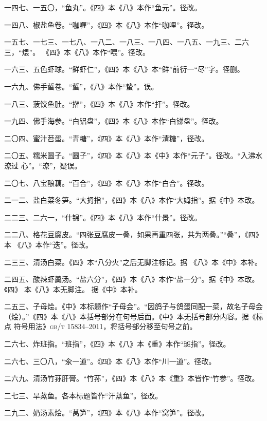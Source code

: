 \begin{list}{}
一四七、一五〇，“鱼丸”。《四》本《八》本作“鱼元”。径改。

一四八、椒盐鱼卷。“咖喱”，《四》本《八》本作“咖哩”。径改。

一五七、一七三、一七八、一八二、一八三、一八四、一八五、一九三、二六三，“煨”。
《四》本《八》本作“喂”。径改。

一六三、五色虾球。“鲜虾仁”，《四》本《八》本“鲜”前衍一“尽”字。径删。

一六九、佛手蜇卷。“蜇”，《八》本作“蛰”。误。

一八三、菠饺鱼肚。“擀”，《四》本《八》本作“扞”。径改。

一九四、佛手海参。“白铝盘”，《四》本《八》本作“白锑盘”。径改。

二〇四、蜜汁苕蛋。“青糖”，《四》本《八》本作“清糖”，径改。

二〇五、糯米圆子。“圆子”，《四》本《八》本《中》本作“元子”。径改。“入沸水潦过
心”。“潦”，疑误。

二〇七、八宝酿藕。“百合”，《四》本《八》本作“白合”。径改。

二一二、盐白菜冬笋。“大拇指”，《四》本《八》本作“大姆指”。据《中》本改。

二二三、二六一，“什锦”。《四》本《八》本作“什景”。径改。

二二八、格花豆腐皮。“四张豆腐皮一叠，如果再重四张，共为两叠。”“叠”，《四》本
《八》本作“迭”。径改。

二三三、清汤白菜。《四》本“八分火”之后无脚注标记{\footnotesize{}}。据
《八》本《中》本补。

二四五、酸辣虾羹汤。“盐六分”，《四》本《八》本作“盐一分”。据《中》本改。《四》
本《八》本无脚注{\footnotesize{}}。
据《中》本补。

二五三、子母烩。《中》本标题作“子母会”。“因鸽子与鸽蛋同配一菜，故名子母会
（烩）。”《四》本《八》本括号部分在句号后面。《中》本无括号部分内容。据《标点
符号用法》\textsc{gb/t 15834--2011}，将括号部分移至句号之前。

二六七、炸班指。“班指”，《四》本《八》本《重》本作“斑指”。径改。

二六七、三〇八，“汆一道”。《四》本《八》本作“川一道”。径改。

二六九、清汤竹荪肝膏。“竹荪”，《四》本《八》本《重》本皆作“竹参”。径改。

二七三、旱蒸鱼。各本标题皆作“汗蒸鱼”。径改。

二九二、奶汤素烩。“莴笋”，《四》本《八》本作“窝笋”。径改。

\end{list}
\endgroup%

